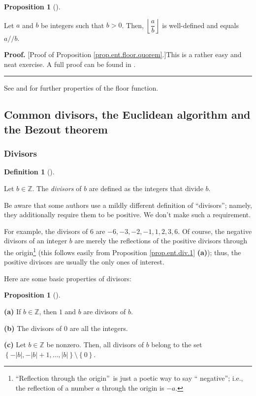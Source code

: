 \documentclass[numbers=enddot,12pt,final,onecolumn,notitlepage]{scrartcl}%
\newcounter{exer}
\numberwithin{exer}{subsection}
\theoremstyle{definition}
\newtheorem{prop}[theo]{Proposition}
\newenvironment{proposition}[1][]
{\begin{prop}[#1]\begin{leftbar}}
{\end{leftbar}\end{prop}}
\newtheorem{defi}[theo]{Definition}
\newenvironment{definition}[1][]
{\begin{defi}[#1]\begin{leftbar}}
{\end{leftbar}\end{defi}}
\newenvironment{proof}[1][Proof]{\noindent\textbf{#1.} }{\ \rule{0.5em}{0.5em}}
\begin{document}
\begin{proposition}
\label{prop.ent.floor.quorem}Let $a$ and $b$ be integers such that $b>0$.
Then, $\left\lfloor \dfrac{a}{b}\right\rfloor $ is well-defined and equals
$a//b$.
\end{proposition}

\begin{proof}
[Proof of Proposition \ref{prop.ent.floor.quorem}.]This is a rather easy and
neat exercise. A full proof can be found in \cite[proof of Proposition
1.1.3]{floor}.
\end{proof}

See \cite{floor} and \cite[\S 4.1]{NiZuMo91} for further properties of the
floor function.

\subsection{Common divisors, the Euclidean algorithm and the Bezout theorem}

\subsubsection{Divisors}

\begin{definition}
\label{def.ent.divisors.divisors}Let $b\in\mathbb{Z}$. The \textit{divisors}
of $b$ are defined as the integers that divide $b$.
\end{definition}

Be aware that some authors use a mildly different definition of
\textquotedblleft divisors\textquotedblright; namely, they additionally
require them to be positive. We don't make such a requirement.

For example, the divisors of $6$ are $-6,-3,-2,-1,1,2,3,6$. Of course, the
negative divisors of an integer $b$ are merely the reflections of the positive
divisors through the origin\footnote{\textquotedblleft Reflection through the
origin\textquotedblright\ is just a poetic way to say \textquotedblleft
negative\textquotedblright; i.e., the reflection of a number $a$ through the
origin is $-a$.} (this follows easily from Proposition \ref{prop.ent.div.1}
\textbf{(a)}); thus, the positive divisors are usually the only ones of interest.

Here are some basic properties of divisors:

\begin{proposition}
\label{prop.ent.divisors.find}\textbf{(a)} If $b\in\mathbb{Z}$, then $1$ and
$b$ are divisors of $b$.

\textbf{(b)} The divisors of $0$ are all the integers.

\textbf{(c)} Let $b\in\mathbb{Z}$ be nonzero. Then, all divisors of $b$ belong
to the set $\left\{  -\left\vert b\right\vert ,-\left\vert b\right\vert
+1,\ldots,\left\vert b\right\vert \right\}  \setminus\left\{  0\right\}  $.
\end{proposition}
\end{document}

